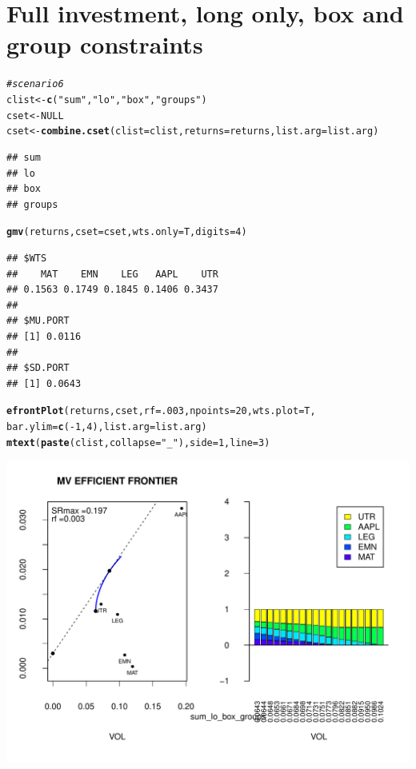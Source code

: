 \documentclass{uwstat518}\usepackage[]{graphicx}\usepackage[]{color}
\makeatletter
\def\maxwidth{ %
  \ifdim\Gin@nat@width>\linewidth
    \linewidth
  \else
    \Gin@nat@width
  \fi
}
\newcommand{\hlstr}[1]{\textcolor[rgb]{0.192,0.494,0.8}{#1}}%
\newcommand{\hlcom}[1]{\textcolor[rgb]{0.678,0.584,0.686}{\textit{#1}}}%
\newcommand{\hlkwd}[1]{\textcolor[rgb]{0.737,0.353,0.396}{\textbf{#1}}}%
\newenvironment{kframe}{%
 \def\at@end@of@kframe{}%
 \ifinner\ifhmode%
  \def\at@end@of@kframe{\end{minipage}}%
  \begin{minipage}{\columnwidth}%
 \fi\fi%
 \def\FrameCommand##1{\hskip\@totalleftmargin \hskip-\fboxsep
 \colorbox{shadecolor}{##1}\hskip-\fboxsep
     \hskip-\linewidth \hskip-\@totalleftmargin \hskip\columnwidth}%
 \MakeFramed {\advance\hsize-\width
   \@totalleftmargin\z@ \linewidth\hsize
   \@setminipage}}%
 {\par\unskip\endMakeFramed%
 \at@end@of@kframe}
\newenvironment{knitrout}{}{} %
\makeatother
\begin{document}
\section{Full investment, long only, box and group constraints}
\begin{knitrout}
\color{fgcolor}\begin{kframe}
\begin{alltt}
\hlcom{# scenario 6}
clist <- \hlkwd{c}(\hlstr{"sum"},\hlstr{"lo"},\hlstr{"box"},\hlstr{"groups"})
cset <- NULL
cset <-\hlkwd{combine.cset}(clist=clist,returns=returns,list.arg=list.arg)
\end{alltt}
\begin{verbatim}
## sum 
## lo 
## box 
## groups
\end{verbatim}
\begin{alltt}
\hlkwd{gmv}(returns, cset=cset, wts.only=T,digits=4)
\end{alltt}
\begin{verbatim}
## $WTS
##    MAT    EMN    LEG   AAPL    UTR 
## 0.1563 0.1749 0.1845 0.1406 0.3437 
## 
## $MU.PORT
## [1] 0.0116
## 
## $SD.PORT
## [1] 0.0643
\end{verbatim}
\begin{alltt}
\hlkwd{efrontPlot}(returns, cset, rf = .003, npoints = 20,wts.plot = T,
		bar.ylim = \hlkwd{c}(-1,4),list.arg=list.arg)
\hlkwd{mtext}(\hlkwd{paste}(clist,collapse=\hlstr{"_"}),side=1,line=3)
\end{alltt}
\end{kframe}
\includegraphics[width=\maxwidth]{figure/unnamed-chunk-9} 

\end{knitrout}
\end{document}
